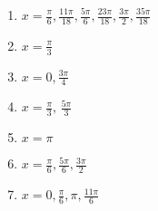 \begin{enumerate}
    \item $x = \frac{\pi}{6}, \frac{11\pi}{18}, \frac{5\pi}{6}, \frac{23\pi}{18}, \frac{3\pi}{2}, \frac{35\pi}{18} $
    \item $x = \frac{\pi}{3}$
    \item $x = 0, \frac{3\pi}{4}$
    
    \item $x = \frac{\pi}{3}, \, \frac{5\pi}{3}$
    \item $x = \pi$
    \item $x = \frac{\pi}{6}, \frac{5\pi}{6}, \frac{3\pi}{2}$
    \item $x = 0, \frac{\pi}{6}, \pi, \frac{11\pi}{6}$
\end{enumerate}
